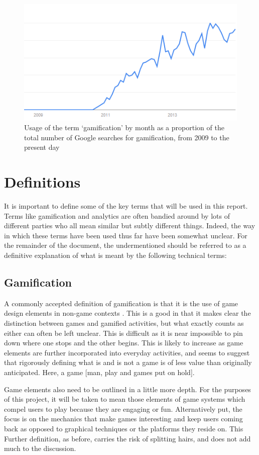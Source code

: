 \documentclass{article}
\begin{document}
\begin{figure}
	\includegraphics{../img/usage-graph.png}
	\caption{Usage of the term `gamification' by month as a proportion of the total number of Google searches for gamification, from 2009 to the present day \cite{usage}}
	\label{usagegraph}
\end{figure}

\section{Definitions}
It is important to define some of the key terms that will be used in this report. Terms like gamification and analytics are often bandied around by lots of different parties who all mean similar but subtly different things. Indeed, the way in which these terms have been used thus far have been somewhat unclear. For the remainder of the document, the undermentioned should be referred to as a definitive explanation of what is meant by the following technical terms:

\subsection{Gamification}
A commonly accepted definition of gamification is that it is the use of game design elements in non-game contexts \cite{deterding2011game}. This is a good in that it makes clear the distinction between games and gamified activities, but what exactly counts as either can often be left unclear. This is difficult as it is near impossible to pin down where one stops and the other begins. This is likely to increase as game elements are further incorporated into everyday activities, and seems to suggest that rigorously defining what is and is not a game is of less value than originally anticipated. Here, a game [man, play and games put on hold].

Game elements also need to be outlined in a little more depth. For the purposes of this project, it will be taken to mean those elements of game systems which compel users to play because they are engaging or fun. Alternatively put, the focus is on the mechanics that make games interesting and keep users coming back as opposed to graphical techniques or the platforms they reside on. This  Further definition, as before, carries the risk of splitting hairs, and does not add much to the discussion.
\end{document}
